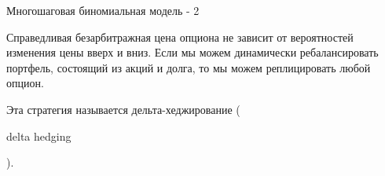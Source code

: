 \documentclass{beamer}
\newcommand{\en}[1]{\begin{otherlanguage}{english}#1\end{otherlanguage}}
\begin{document}
\begin{frame}{Многошаговая биномиальная модель - 2}
\centering
{}

\justify
Справедливая безарбитражная цена опциона не зависит от вероятностей изменения цены вверх и вниз. Если мы можем \alert{динамически} ребалансировать портфель, состоящий из акций и долга, то мы можем реплицировать любой опцион.

\justify
Эта стратегия называется \alert{дельта-хеджирование} (\en{delta hedging}).
\end{frame}



\newcommand{\highlightStockLink}[6]{
	\draw[
		color=#4,
		very thick,
		->,
		>=triangle 45
	]
	(#1.east) -- (#2.west)
	node[
		pos=#5,
		anchor=#6
	]
	{#3};
}
\end{document}
